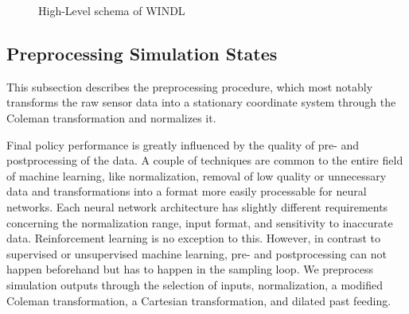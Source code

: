 \begin{figure}
  \centering
  
    \caption{High-Level schema of \ac{WINDL}}
    \label{fig:high-level-schema}
\end{figure}

\subsection{Preprocessing Simulation States}
\label{section:approach-preprocessing}

\begin{summary}
This subsection describes the preprocessing procedure, which most notably transforms the raw sensor data into a stationary coordinate system through the Coleman transformation and normalizes it.
\end{summary}

Final policy performance is greatly influenced by the quality of pre- and postprocessing of the data. A couple of techniques are common to the entire field of machine learning, like normalization, removal of low quality or unnecessary data and transformations into a format more easily processable for neural networks. Each neural network architecture has slightly different requirements concerning the normalization range, input format, and sensitivity to inaccurate data. Reinforcement learning is no exception to this. However, in contrast to supervised or unsupervised machine learning, pre- and postprocessing can not happen beforehand but has to happen in the sampling loop. We preprocess simulation outputs through the selection of inputs, normalization, a modified Coleman transformation, a Cartesian transformation, and dilated past feeding. 


